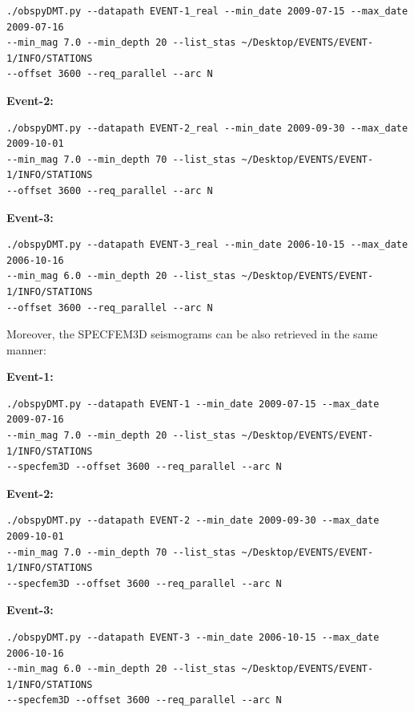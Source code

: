 \documentclass{article}
\begin{document}
\begin{verbatim}
./obspyDMT.py --datapath EVENT-1_real --min_date 2009-07-15 --max_date 2009-07-16 
--min_mag 7.0 --min_depth 20 --list_stas ~/Desktop/EVENTS/EVENT-1/INFO/STATIONS 
--offset 3600 --req_parallel --arc N
\end{verbatim}

\textbf{Event-2:}

\begin{verbatim}
./obspyDMT.py --datapath EVENT-2_real --min_date 2009-09-30 --max_date 2009-10-01 
--min_mag 7.0 --min_depth 70 --list_stas ~/Desktop/EVENTS/EVENT-1/INFO/STATIONS 
--offset 3600 --req_parallel --arc N
\end{verbatim}

\textbf{Event-3:}

\begin{verbatim}
./obspyDMT.py --datapath EVENT-3_real --min_date 2006-10-15 --max_date 2006-10-16 
--min_mag 6.0 --min_depth 20 --list_stas ~/Desktop/EVENTS/EVENT-1/INFO/STATIONS 
--offset 3600 --req_parallel --arc N
\end{verbatim}

Moreover, the SPECFEM3D seismograms can be also retrieved in the same manner:

\textbf{Event-1:}

\begin{verbatim}
./obspyDMT.py --datapath EVENT-1 --min_date 2009-07-15 --max_date 2009-07-16 
--min_mag 7.0 --min_depth 20 --list_stas ~/Desktop/EVENTS/EVENT-1/INFO/STATIONS 
--specfem3D --offset 3600 --req_parallel --arc N
\end{verbatim}

\textbf{Event-2:}

\begin{verbatim}
./obspyDMT.py --datapath EVENT-2 --min_date 2009-09-30 --max_date 2009-10-01 
--min_mag 7.0 --min_depth 70 --list_stas ~/Desktop/EVENTS/EVENT-1/INFO/STATIONS 
--specfem3D --offset 3600 --req_parallel --arc N
\end{verbatim}

\textbf{Event-3:}

\begin{verbatim}
./obspyDMT.py --datapath EVENT-3 --min_date 2006-10-15 --max_date 2006-10-16 
--min_mag 6.0 --min_depth 20 --list_stas ~/Desktop/EVENTS/EVENT-1/INFO/STATIONS 
--specfem3D --offset 3600 --req_parallel --arc N
\end{verbatim}
\end{document}
